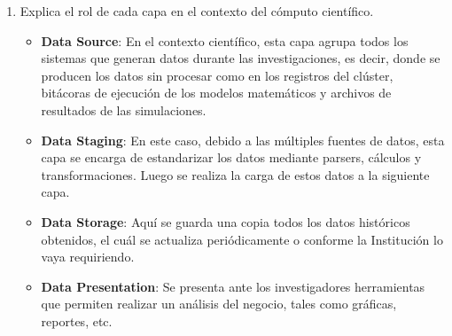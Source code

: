\begin{enumerate}
        \begin{itemize}
            \item \textbf{Data Source}: Aquí es de donde viene todo. Son los sistemas transaccionales (OLTP), archivos o bases de datos externas que tienen la información sin procesar.

            \item \textbf{Data Staging}: Es como una zona de paso. Aquí se hace el proceso de ETL (Extraer, Transformar y Cargar), donde se limpian, estandarizan y acomodan los datos para que no tengan errores antes de guardarlos.

            \item \textbf{Data Storage}: Es el núcleo del sistema. Aquí ya vive el Data Warehouse centralizado y los Data Marts, los cuales son fragmentos de esa información ya organizada y lista para ser consultada de forma histórica.

            \item \textbf{Data Presentation}: Es la capa que ve el usuario final. Se usa para hacer el análisis de datos, sacar reportes  o aplicar minería de datos para encontrar patrones útiles para el negocio.
        \end{itemize}

        \item Explica el rol de cada capa en el contexto del cómputo científico.

        \begin{itemize}
            \item \textbf{Data Source}: En el contexto científico, esta capa agrupa todos los sistemas que generan datos durante las investigaciones, es decir, donde se producen los datos sin procesar como en los registros del clúster, bitácoras de ejecución de los modelos matemáticos y archivos de resultados de las simulaciones.

            \item \textbf{Data Staging}: En este caso, debido a las múltiples fuentes de datos, esta capa se encarga de estandarizar los datos mediante parsers, cálculos y transformaciones. Luego se realiza la carga de estos datos a la siguiente capa.

            \item \textbf{Data Storage}: Aquí se guarda una copia todos los datos históricos obtenidos, el cuál se actualiza periódicamente o conforme la Institución lo vaya requiriendo.

            \item \textbf{Data Presentation}: Se presenta ante los investigadores herramientas que permiten realizar un análisis del negocio, tales como gráficas, reportes, etc.
        \end{itemize}


\end{enumerate}
